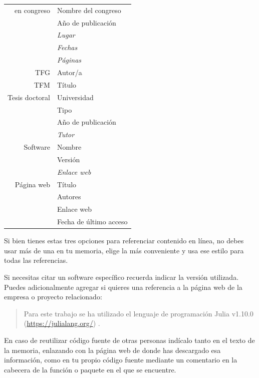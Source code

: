 \begin{table}[!hbt]
\begin{minipage}{0.48\linewidth}
\begin{tabular}{r|l}
            en congreso & Nombre del congreso\\
            & Año de publicación\\
            & {\it Lugar} \\
            & {\it Fechas} \\
            & {\it Páginas} \\
            \midrule
            TFG & Autor/a\\
            TFM & Título \\
            Tesis doctoral & Universidad \\
            & Tipo \\
            & Año de publicación \\
            & {\it Tutor} \\
            \midrule
            Software & Nombre \\
            & Versión \\
            & {\it Enlace web} \\
            \midrule
            Página web & Título \\
            & Autores \\
            & Enlace web \\
            & Fecha de último acceso \\
            \bottomrule
        \end{tabular}
    \end{minipage}
    \label{tab:citar}
\end{table}

Si bien tienes estas tres opciones para referenciar contenido en línea, no debes usar más de una en tu memoria, elige la más conveniente y usa ese estilo para todas las referencias.

Si necesitas citar un software específico recuerda indicar la versión utilizada. Puedes adicionalmente agregar si quieres una referencia a la página web de la empresa o proyecto relacionado:

\begin{quote}
\begin{it}
    Para este trabajo se ha utilizado el lenguaje de programación Julia v1.10.0 (\url{https://julialang.org/}) \cite{bezanson2017julia}.
\end{it}
\end{quote}

En caso de reutilizar código fuente de otras personas indícalo tanto en el texto de la memoria, enlazando con la página web de donde has descargado esa información, como en tu propio código fuente mediante un comentario en la cabecera de la función o paquete en el que se encuentre.

